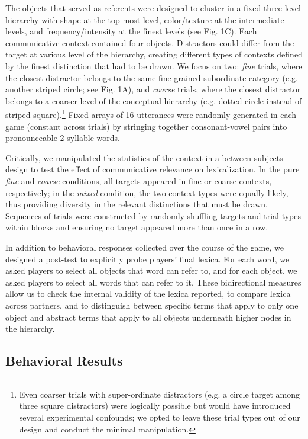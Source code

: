 \documentclass[10pt,letterpaper]{article}
\begin{document}
The objects that served as referents were designed to cluster in a fixed three-level hierarchy with shape at the top-most level, color/texture at the intermediate levels, and frequency/intensity at the finest levels (see Fig. 1C). Each communicative context contained four objects. Distractors could differ from the target at various level of the hierarchy, creating different types of contexts defined by the finest distinction that had to be drawn. We focus on two: \emph{fine} trials, where the closest distractor belongs to the same fine-grained subordinate category (e.g. another striped circle; see Fig. 1A), and \emph{coarse} trials, where the closest distractor belongs to a coarser level of the conceptual hierarchy (e.g. dotted circle instead of striped square).\footnote{Even coarser trials with super-ordinate distractors (e.g. a circle target among three square distractors) were logically possible but would have introduced several experimental confounds; we opted to leave these trial types out of our design and conduct the minimal manipulation.} Fixed arrays of 16 utterances were randomly generated in each game (constant across trials) by stringing together consonant-vowel pairs into pronounceable 2-syllable words.

Critically, we manipulated the statistics of the context in a between-subjects design to test the effect of communicative relevance on lexicalization. In the pure \emph{fine} and \emph{coarse} conditions, all targets appeared in fine or coarse contexts, respectively; in the \emph{mixed} condition, the two context types were equally likely, thus providing diversity in the relevant distinctions that must be drawn. Sequences of trials were constructed by randomly shuffling targets and trial types within blocks and ensuring no target appeared more than once in a row. 

In addition to behavioral responses collected over the course of the game, we designed a post-test to explicitly probe players' final lexica. For each word, we asked players to select all objects that word can refer to, and for each object, we asked players to select all words that can refer to it. These bidirectional measures allow us to check the internal validity of the lexica reported, to compare lexica across partners, and to distinguish between specific terms that apply to only one object and abstract terms that apply to all objects underneath higher nodes in the hierarchy. 

\subsection{Behavioral Results}
\end{document}
